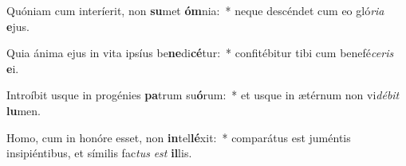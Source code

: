 \item Quóniam cum interíerit, non \textbf{su}met \textbf{óm}nia:~* neque descéndet cum eo gló\textit{ri}\textit{a} \textbf{e}jus.
\item Quia ánima ejus in vita ipsíus be\textbf{ne}di\textbf{cé}tur:~* confitébitur tibi cum benefé\textit{ce}\textit{ris} \textbf{e}i.
\item Introíbit usque in progénies \textbf{pa}trum su\textbf{ó}rum:~* et usque in ætérnum non vi\textit{dé}\textit{bit} \textbf{lu}men.
\item Homo, cum in honóre esset, non \textbf{in}tel\textbf{lé}xit:~* comparátus est juméntis insipiéntibus, et símilis fac\textit{tus} \textit{est} \textbf{il}lis.
